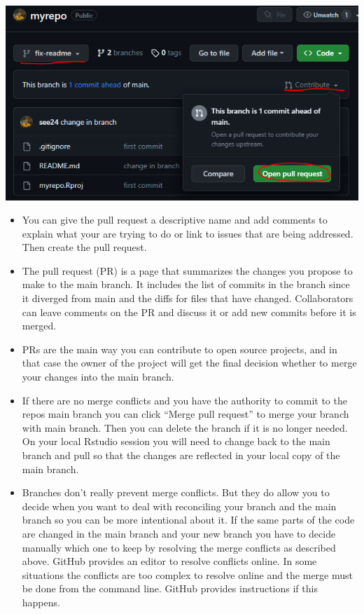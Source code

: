 \documentclass[
  letterpaper,
  DIV=11,
  numbers=noendperiod]{scrreprt}
\providecommand{\tightlist}{%
  \setlength{\itemsep}{0pt}\setlength{\parskip}{0pt}}\usepackage{longtable,booktabs,array}
\begin{document}
\includegraphics{assets/img/make_PR.png}

\begin{itemize}
\tightlist
\item
  You can give the pull request a descriptive name and add comments to
  explain what your are trying to do or link to issues that are being
  addressed. Then create the pull request.
\item
  The pull request (PR) is a page that summarizes the changes you
  propose to make to the main branch. It includes the list of commits in
  the branch since it diverged from main and the diffs for files that
  have changed. Collaborators can leave comments on the PR and discuss
  it or add new commits before it is merged.
\item
  PRs are the main way you can contribute to open source projects, and
  in that case the owner of the project will get the final decision
  whether to merge your changes into the main branch.
\item
  If there are no merge conflicts and you have the authority to commit
  to the repos main branch you can click ``Merge pull request'' to merge
  your branch with main branch. Then you can delete the branch if it is
  no longer needed. On your local Rstudio session you will need to
  change back to the main branch and pull so that the changes are
  reflected in your local copy of the main branch.
\item
  Branches don't really prevent merge conflicts. But they do allow you
  to decide when you want to deal with reconciling your branch and the
  main branch so you can be more intentional about it. If the same parts
  of the code are changed in the main branch and your new branch you
  have to decide manually which one to keep by resolving the merge
  conflicts as described above. GitHub provides an editor to resolve
  conflicts online. In some situations the conflicts are too complex to
  resolve online and the merge must be done from the command line.
  GitHub provides instructions if this happens.
\end{itemize}
\end{document}
